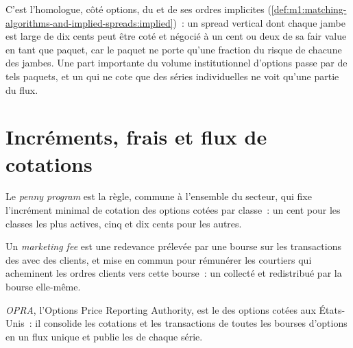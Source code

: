 C'est l'homologue, côté options, du  et de ses ordres implicites
(\cref{def:m1:matching-algorithms-and-implied-spreads:implied})~: un spread vertical dont
chaque jambe est large de dix cents peut être coté et négocié à un cent ou deux de sa
fair value en tant que paquet, car le paquet ne porte qu'une fraction du risque de
chacune des jambes. Une part importante du volume institutionnel d'options passe par de
tels paquets, et un  qui ne cote que des séries individuelles ne voit
qu'une partie du flux.

\section{Incréments, frais et flux de cotations}

\begin{definition}\label{def:m1:options-market-structure:penny}
Le \emph{penny program} est la règle, commune à l'ensemble du secteur,
qui fixe l'incrément minimal de cotation des options cotées par classe~: un cent pour
les classes les plus actives, cinq et dix cents pour les autres.
\end{definition}

\begin{definition}\label{def:m1:options-market-structure:marketing}
Un \emph{marketing fee} est une redevance prélevée par une bourse sur
les transactions des  avec des clients, et mise en commun pour rémunérer les
courtiers qui acheminent les ordres clients vers cette bourse~: un  collecté et redistribué par la bourse elle-même.
\end{definition}

\begin{definition}[OPRA]\label{def:m1:options-market-structure:opra}
\emph{OPRA}, l'Options Price Reporting Authority, est le
 des options cotées aux États-Unis~: il consolide les
cotations et les transactions de toutes les bourses d'options en un flux unique et publie les
 de chaque série.
\end{definition}

